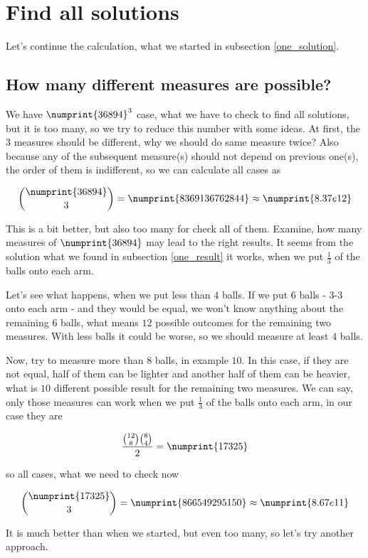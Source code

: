 \documentclass[11pt]{article} %
\begin{document}
\section{Find all solutions}

Let's continue the calculation, what we started in subsection \ref{one_solution}.

\subsection{How many different measures are possible?} \label{how_many}

We have $\numprint{36894}^3$ case, what we have to check to find all solutions, but it is too many, so we try to reduce this number with some ideas. At first, the $3$ measures should be different, why we should do same measure twice? Also because any of the subsequent measure(s) should not depend on previous one(s), the order of them is indifferent, so we can calculate all cases as

\[ \binom{\numprint{36894}}{3} = \numprint{8369136762844} \approx \numprint{8.37e12} \]

This is a bit better, but also too many for check all of them. Examine, how many measures of $\numprint{36894}$ may lead to the right results. It seems from the solution what we found in subsection \ref{one_result} it works, when we put $\frac{1}{3}$ of the balls onto each arm.

Let's see what happens, when we put less than $4$ balls. If we put $6$ balls - $3$-$3$ onto each arm - and they would be equal, we won't know anything about the remaining $6$ balls, what means $12$ possible outcomes for the remaining two measures. With less balls it could be worse, so we should measure at least $4$ balls.

Now, try to measure more than $8$ balls, in example $10$. In this case, if they are not equal, half of them can be lighter and another half of them can be heavier, what is $10$ different possible result for the remaining two measures. We can say, only those measures can work when we put $\frac{1}{3}$ of the balls onto each arm, in our case they are

\[ \frac{\binom{12}{8}\binom{8}{4}}{2} = \numprint{17325} \]

so all cases, what we need to check now

\[ \binom{\numprint{17325}}{3} = \numprint{866549295150} \approx \numprint{8.67e11} \]

It is much better than when we started, but even too many, so let's try another approach.
\end{document}
